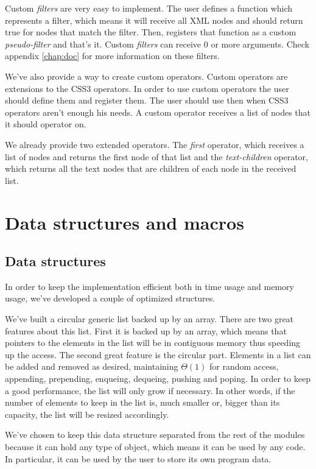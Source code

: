 \documentclass[a4paper]{report}
\begin{document}
		Custom \emph{filters} are very easy to implement. The user defines a function which represents a filter, which means it will receive all XML nodes and should return true for nodes that match the filter.
		Then, registers that function as a custom \emph{pseudo-filter} and that's it. Custom \emph{filters} can receive 0 or more arguments. Check appendix \ref{chap:doc} for more information on these filters.
		
		We've also provide a way to create custom operators. Custom operators are extensions to the CSS3 operators. In order to use custom operators the user should define them and register them. The user should use 
		then when CSS3 operators aren't enough his needs. A custom operator receives a list of nodes that it should operator on.
		
		We already provide two extended operators. The \emph{first} operator, which receives a list of nodes and returns the first node of that list and the \emph{text-children} operator, which returns all the text nodes that are 
		children of each node in the received list.

\section{Data structures and macros}\label{sec:helpers}

	\subsection{Data structures}
		In order to keep the implementation efficient both in time usage and memory usage, we've developed a couple of optimized structures.

		We've built a circular generic list backed up by an array. There are two great features about this list. First it is backed up by an array, which means that pointers to the elements in the list will be in contiguous memory thus speeding up the access. The second great feature is the circular part. Elements in a list can be added and removed as desired, maintaining $\Theta(1)$ for random access, appending, prepending, enqueing, dequeing, pushing and poping. In order to keep a good performance, the list will only grow if necessary. In other words, if the number of elements to keep in the list is, much smaller or, bigger than its capacity, the list will be resized accordingly.

		We've chosen to keep this data structure separated from the rest of the modules because it can hold any type of object, which means it can be used by any code. In particular, it can be used by the user to store its own program data.
\end{document}
